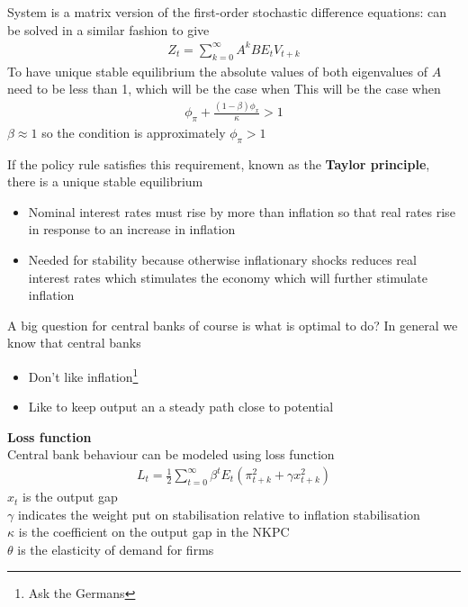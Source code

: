 \documentclass{beamer}
\begin{document}
\begin{frame}
  System is a matrix version of the first-order stochastic difference equations: can be solved in a similar fashion to give
\begin{align}
  Z_t=\sum_{k=0}^{\infty}A^k BE_tV_{t+k}
\end{align}
To have unique stable equilibrium the absolute values of both eigenvalues of $A$ need to be less than 1, which will be the case when
This will be the case when 
\begin{align}  
  \phi_{\pi}+\frac{(1-\beta)\phi_x}{\kappa}>1 
\end{align}
$\beta \approx 1$ so the condition is approximately $\phi_{\pi}>1$
\end{frame}

\begin{frame}
  If the policy rule satisfies this requirement, known as the \textbf{Taylor principle}, there is a unique stable equilibrium
  \begin{itemize}
    \item Nominal interest rates must rise by more than inflation so that real rates rise in response to an increase in inflation
    \item Needed for stability because otherwise inflationary shocks reduces real interest rates which stimulates the economy which will further stimulate inflation
  \end{itemize}
  A big question for central banks of course is what is optimal to do? 
  In general we know that central banks 
\begin{itemize}
  \item Don't like inflation\footnote{Ask the Germans}
  \item Like to keep output an a steady path close to potential
\end{itemize}
\end{frame}

\begin{frame}
  \textbf{Loss function}\\
   Central bank behaviour can be modeled using loss function   
  \begin{align} 
  L_t = \frac{1}{2}\sum_{t=0}^{\infty}\beta^tE_t(\pi_{t+k}^2 + \gamma x_{t+k}^2) 
\end{align}
$x_t$ is the output gap\\
$\gamma$ indicates the weight put on stabilisation relative to inflation stabilisation\\
$\kappa$ is the coefficient on the output gap in the NKPC \\
$\theta$ is the elasticity of demand for firms\\

\end{frame}
\end{document}
